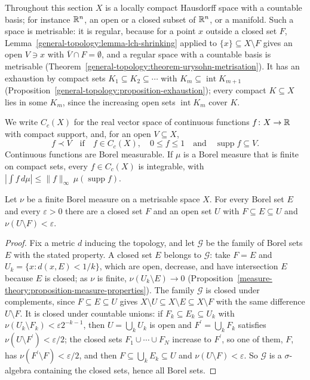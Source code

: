 Throughout this section $X$ is a locally compact Hausdorff space with a countable basis; for instance $\mathbb{R}^n$, an open or a closed subset of $\mathbb{R}^n$, or a manifold. Such a space is metrisable: it is
regular, because for a point $x$ outside a closed set $F$, Lemma~\ref{general-topology:lemma-lch-shrinking} applied to $\{x\} \subseteq X \setminus F$ gives an open $V \ni x$ with
$\overline{V} \cap F = \emptyset$, and a regular space with a countable basis is metrisable (Theorem~\ref{general-topology:theorem-urysohn-metrisation}). It has an exhaustion by compact sets
$K_1 \subseteq K_2 \subseteq \cdots$ with $K_m \subseteq \operatorname{int}K_{m+1}$ (Proposition~\ref{general-topology:proposition-exhaustion}); every compact $K \subseteq X$ lies in some $K_m$, since the
increasing open sets $\operatorname{int}K_m$ cover $K$.

We write $C_c(X)$ for the real vector space of continuous functions $f \colon X \to \mathbb{R}$ with compact support, and, for an open $V \subseteq X$,
\[
f \prec V \quad \text{if} \quad f \in C_c(X), \quad 0 \leq f \leq 1 \quad \text{and} \quad \operatorname{supp}f \subseteq V.
\]
Continuous functions are Borel measurable. If $\mu$ is a Borel measure that is finite on compact sets, every $f \in C_c(X)$ is integrable, with $|\int f\,d\mu| \leq \|f\|_\infty\,\mu(\operatorname{supp}f)$.

\begin{lemma}\label{measure-theory:lemma-closed-approximation}
Let $\nu$ be a finite Borel measure on a metrisable space $X$. For every Borel set $E$ and every $\varepsilon > 0$ there are a closed set $F$ and an open set $U$ with $F \subseteq E \subseteq U$ and
$\nu(U \setminus F) < \varepsilon$.
\end{lemma}

\begin{proof}
Fix a metric $d$ inducing the topology, and let $\mathcal{G}$ be the family of Borel sets $E$ with the stated property. A closed set $E$ belongs to $\mathcal{G}$: take $F = E$ and
$U_k = \{x : d(x, E) < 1/k\}$, which are open, decrease, and have intersection $E$ because $E$ is closed; as $\nu$ is finite, $\nu(U_k \setminus E) \to 0$
(Proposition~\ref{measure-theory:proposition-measure-properties}). The family $\mathcal{G}$ is closed under complements, since $F \subseteq E \subseteq U$ gives
$X \setminus U \subseteq X \setminus E \subseteq X \setminus F$ with the same difference $U \setminus F$. It is closed under countable unions: if $F_k \subseteq E_k \subseteq U_k$ with
$\nu(U_k \setminus F_k) < \varepsilon 2^{-k-1}$, then $U = \bigcup_kU_k$ is open and $F^{\prime} = \bigcup_kF_k$ satisfies $\nu(U \setminus F^{\prime}) < \varepsilon/2$; the closed sets
$F_1 \cup \cdots \cup F_N$ increase to $F^{\prime}$, so one of them, $F$, has $\nu(F^{\prime} \setminus F) < \varepsilon/2$, and then $F \subseteq \bigcup_kE_k \subseteq U$ and $\nu(U \setminus F) < \varepsilon$.
So $\mathcal{G}$ is a $\sigma$-algebra containing the closed sets, hence all Borel sets.
\end{proof}

